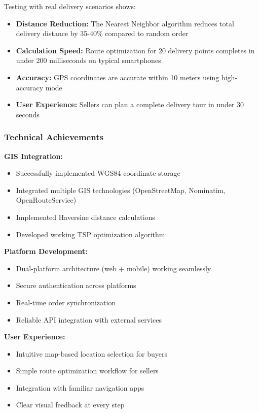 \documentclass[12pt,a4paper]{article}
\begin{document}
Testing with real delivery scenarios shows:

\begin{itemize}
    \item \textbf{Distance Reduction:} The Nearest Neighbor algorithm reduces total delivery distance by 35-40\% compared to random order
    \item \textbf{Calculation Speed:} Route optimization for 20 delivery points completes in under 200 milliseconds on typical smartphones
    \item \textbf{Accuracy:} GPS coordinates are accurate within 10 meters using high-accuracy mode
    \item \textbf{User Experience:} Sellers can plan a complete delivery tour in under 30 seconds
\end{itemize}

\subsubsection{Technical Achievements}

\textbf{GIS Integration:}
\begin{itemize}
    \item Successfully implemented WGS84 coordinate storage
    \item Integrated multiple GIS technologies (OpenStreetMap, Nominatim, OpenRouteService)
    \item Implemented Haversine distance calculations
    \item Developed working TSP optimization algorithm
\end{itemize}

\textbf{Platform Development:}
\begin{itemize}
    \item Dual-platform architecture (web + mobile) working seamlessly
    \item Secure authentication across platforms
    \item Real-time order synchronization
    \item Reliable API integration with external services
\end{itemize}

\textbf{User Experience:}
\begin{itemize}
    \item Intuitive map-based location selection for buyers
    \item Simple route optimization workflow for sellers
    \item Integration with familiar navigation apps
    \item Clear visual feedback at every step
\end{itemize}
\end{document}
